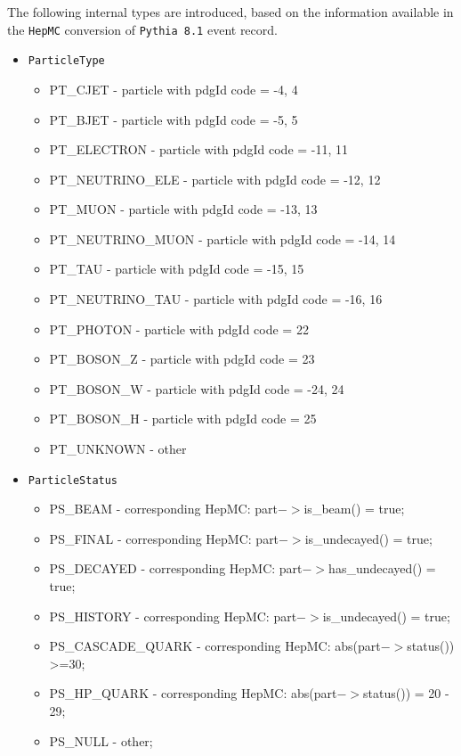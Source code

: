 The following internal types are introduced, based on the information
available in the {\tt HepMC} conversion of {\tt Pythia 8.1} event record.
\begin{itemize}
\item
{\tt ParticleType}
\begin{itemize}
\item
PT\_CJET  - particle with pdgId code = -4, 4
\item
PT\_BJET  - particle with pdgId code = -5, 5
\item
PT\_ELECTRON  - particle with pdgId code = -11, 11
\item
PT\_NEUTRINO\_ELE  - particle with pdgId code = -12, 12
\item
PT\_MUON  - particle with pdgId code = -13, 13
\item
PT\_NEUTRINO\_MUON  - particle with pdgId code = -14, 14
\item
PT\_TAU  - particle with pdgId code = -15, 15
\item
PT\_NEUTRINO\_TAU  - particle with pdgId code = -16, 16
\item
PT\_PHOTON  - particle with pdgId code = 22
\item
PT\_BOSON\_Z  - particle with pdgId code = 23
\item
PT\_BOSON\_W  - particle with pdgId code = -24, 24
\item
PT\_BOSON\_H  - particle with pdgId code = 25
\item
PT\_UNKNOWN  - other 
\end{itemize}
\item
{\tt ParticleStatus}
\begin{itemize}
\item
PS\_BEAM   - corresponding HepMC: part$->$is\_beam() = true;
\item
PS\_FINAL  - corresponding HepMC: part$->$is\_undecayed() = true;
\item
PS\_DECAYED  - corresponding HepMC: part$->$has\_undecayed() = true;
\item
PS\_HISTORY  - corresponding HepMC: part$->$is\_undecayed() = true;
\item
PS\_CASCADE\_QUARK  - corresponding HepMC: abs(part$->$status()) >=30;
\item
PS\_HP\_QUARK  - corresponding HepMC: abs(part$->$status()) = 20 - 29;
\item
PS\_NULL  - other;
\end{itemize}
\end{itemize}

